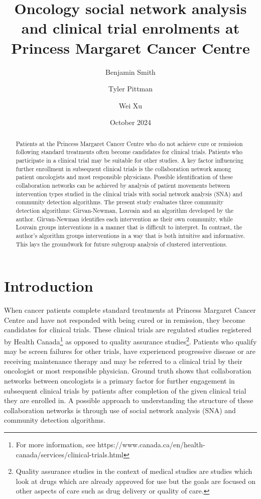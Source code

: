 \documentclass{article}
\title{Oncology social network analysis and clinical trial enrolments at Princess Margaret Cancer Centre}
\author[1]{Benjamin Smith\orcidlink{0009-0007-2206-0177}}
\author[2]{Tyler Pittman\orcidlink{0000-0002-5013-6980}}
\author[2]{Wei Xu\orcidlink{0000-0002-0257-8856}}
\affil[1]{University of Toronto, Toronto, Canada}
\affil[2]{University Health Network, Toronto, Canada}
\date{October 2024} %
\begin{document}
\maketitle

\begin{abstract}
Patients at the Princess Margaret Cancer Centre who do not achieve cure
or remission following standard treatments often become candidates for
clinical trials. Patients who participate in a clinical trial may be
suitable for other studies. A key factor influencing further enrollment
in subsequent clinical trials is the collaboration network among patient
oncologists and most responsible physicians. Possible identification of
these collaboration networks can be achieved by analysis of patient
movements between intervention types studied in the clinical trials with
social network analysis (SNA) and community detection algorithms. The
present study evaluates three community detection algorithms:
Girvan-Newman, Louvain and an algorithm developed by the author.
Girvan-Newman identifies each intervention as their own community, while
Louvain groups interventions in a manner that is difficult to interpret.
In contrast, the author's algorithm groups interventions in a way that
is both intuitive and informative. This lays the groundwork for future
subgroup analysis of clustered interventions.
\end{abstract}
\newpage
\section{Introduction}\label{introduction}

When cancer patients complete standard treatments at Princess Margaret
Cancer Centre and have not responded with being cured or in remission,
they become candidates for clinical trials. These clinical trials are
regulated studies registered by Health Canada\footnote{For more
  information, see
  https://www.canada.ca/en/health-canada/services/clinical-trials.html}
as opposed to quality assurance studies\footnote{Quality assurance
  studies in the context of medical studies are studies which look at
  drugs which are already approved for use but the goals are focused on
  other aspects of care such as drug delivery or quality of care.}.
Patients who qualify may be screen failures for other trials, have
experienced progressive disease or are receiving maintenance therapy and
may be referred to a clinical trial by their oncologist or most
responsible physician. Ground truth shows that collaboration networks
between oncologists is a primary factor for further engagement in
subsequent clinical trials by patients after completion of the given
clinical trial they are enrolled in. A possible approach to
understanding the structure of these collaboration networks is through
use of social network analysis (SNA) and community detection algorithms.
\end{document}
